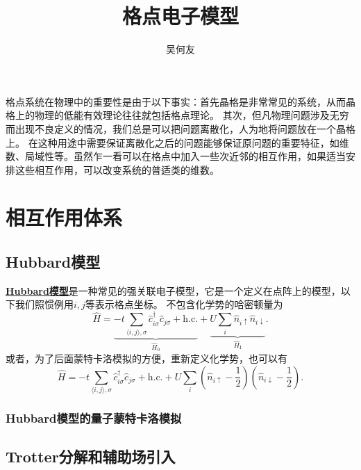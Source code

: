 \documentclass[hyperref, UTF8, a4paper]{ctexart}
\title{格点电子模型}
\author{吴何友}
\newcommand*{\pair}[1]{\langle #1 \rangle}
\newcommand*{\concept}[1]{\underline{\textbf{#1}}}
\begin{document}
\maketitle

格点系统在物理中的重要性是由于以下事实：首先晶格是非常常见的系统，从而晶格上的物理的低能有效理论往往就包括格点理论。
其次，但凡物理问题涉及无穷而出现不良定义的情况，我们总是可以把问题离散化，人为地将问题放在一个晶格上。
在这种用途中需要保证离散化之后的问题能够保证原问题的重要特征，如维数、局域性等。虽然乍一看可以在格点中加入一些次近邻的相互作用，如果适当安排这些相互作用，可以改变系统的普适类的维数。

\section{相互作用体系}

\subsection{Hubbard模型}

\concept{Hubbard模型}是一种常见的强关联电子模型，它是一个定义在点阵上的模型，以下我们照惯例用$i, j$等表示格点坐标。
不包含化学势的哈密顿量为
\begin{equation}
    \hat{H} = \underbrace{-t \sum_{\pair{i, j}, \sigma} \hat{c}_{i\sigma}^\dagger \hat{c}_{j\sigma} + \text{h.c.}}_{\hat{H}_0} + \underbrace{U \sum_i \hat{n}_{i \uparrow} \hat{n}_{i \downarrow}}_{\hat{H}_\text{I}}.
\end{equation}
或者，为了后面蒙特卡洛模拟的方便，重新定义化学势，也可以有
\begin{equation}
    \hat{H} = -t \sum_{\pair{i, j}, \sigma} \hat{c}_{i\sigma}^\dagger \hat{c}_{j\sigma} + \text{h.c.} 
    + U \sum_i \left(\hat{n}_{i\uparrow} - \frac{1}{2}\right) \left(\hat{n}_{i\downarrow} - \frac{1}{2}\right).
\end{equation}

\subsubsection{Hubbard模型的量子蒙特卡洛模拟}

\subsection{Trotter分解和辅助场引入}
\end{document}
